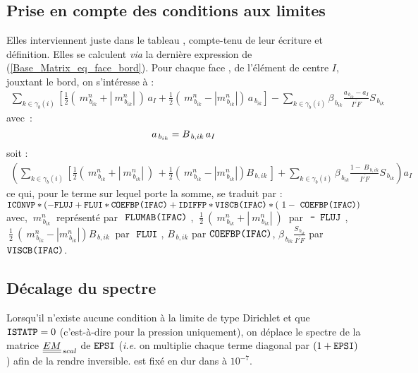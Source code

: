 \subsection*{\bf Prise en compte des conditions aux limites}
Elles interviennent juste dans le tableau , compte-tenu de leur
écriture et définition. Elles se calculent {\it via} la dernière
expression de (\ref{Base_Matrix_eq_face_bord}). Pour chaque face , de l'élément
de centre $I$, jouxtant le bord, on s'intéresse à :
\begin{equation}
\begin{array}{ll}
\sum\limits_{k\in {\gamma_b(i)}}\left[\displaystyle\frac{1}{2}(\ m_{\,{b}_{ik}}^n + |\ m_{\,{b}_{ik}}^n|\ )\,a_I +
\displaystyle\frac{1}{2}(\ m_{\,{b}_{ik}}^n -
|m_{\,{b}_{ik}}^n|)\,a_{\,{b}_{ik}}\right] - \sum\limits_{k\in {\gamma_b(i)}}\displaystyle\beta_{\,b_{ik}}
\frac{a_{\,b_{ik}}- a_I}{\overline{I'F}} S_{\,b_{ik}}
\end{array}
\end{equation}
avec~:
\begin{equation}\notag
a_{\,{b}_{ik}} =  B_{\,b,ik}\,a_I\\
\end{equation}
soit :
\begin{equation}
\begin{array}{ll}
\left(\sum\limits_{k\in {\gamma_b(i)}}\left[\displaystyle\frac{1}{2}(\ m_{\,{b}_{ik}}^n + |\ m_{\,{b}_{ik}}^n|\ )\,+
\displaystyle\frac{1}{2}(\ m_{\,{b}_{ik}}^n -
|m_{\,{b}_{ik}}^n|)B_{\,b,ik}\,\right] + \sum\limits_{k\in {\gamma_b(i)}}\displaystyle\beta_{\,b_{ik}}
\frac{1 -\ B_{\,b,ik}}{\overline{I'F}} S_{\,b_{ik}}\right) a_I
\end{array}
\end{equation}
ce qui, pour le terme sur lequel porte la somme, se traduit par :\\
$\var{ICONVP} * (- \var{FLUJ} + \var{FLUI} * \var{COEFBP(IFAC)} + \var{IDIFFP} *
\var{VISCB(IFAC)} * (\ 1 -\ \var{COEFBP(IFAC)})$ \\ avec,
$\ m_{\,{b}_{ik}}^n\ $ représenté par $\ \var{FLUMAB(IFAC)}\ $,
$\ \displaystyle\frac{1}{2}\ (\
m_{\,{b}_{ik}}^n + |\ m_{\,{b}_{ik}}^n|\ )\ $ par $\ \var{-\ FLUJ}\ $,\\
$\ \displaystyle\frac{1}{2}\ (\ m_{\,{b}_{ik}}^n -
|m_{\,{b}_{ik}}^n|)B_{\,b,ik}\ $ par $\ \var{FLUI}\ $,
$B_{\,b,ik}$ par $\var{COEFBP(IFAC)}$, $\beta_{\,b_{ik}}\displaystyle\frac
{S_{\,b_{ik}}}{\overline{I'F}} $ par $\var{VISCB(IFAC)}$.\\
\subsection*{\bf Décalage du spectre}
Lorsqu'il n'existe aucune condition à la limite de type Dirichlet et que
$\var{ISTATP} = 0 $ (c'est-à-dire pour la pression uniquement), on
déplace le spectre de la matrice ${\tens{EM}}_{\,scal}$ de $$  ({\it i.e.} on multiplie chaque terme diagonal par $(1 + \var{EPSI})$ ) afin
de la rendre inversible. \var{EPSI} est fixé en dur dans \fort{matrix} à
 ${10}^{-7}$.
